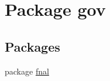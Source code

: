 \hypertarget{namespacegov}{\section{Package gov}
\label{namespacegov}
}
\subsection*{Packages}
\begin{DoxyCompactItemize}
\item 
package \hyperlink{namespacegov_1_1fnal}{fnal}
\end{DoxyCompactItemize}
